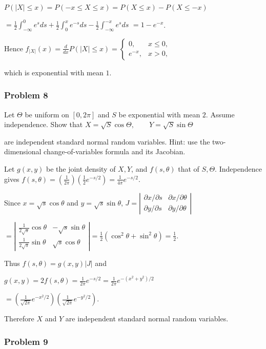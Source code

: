 $P(|X|\leq x)=P(-x\leq X\leq x)=P(X\leq x)-P(X\leq-x)$

$=\frac12\int_{-\infty}^0e^sds+\frac12\int_0^xe^{-s}ds-\frac12\int_{-\infty}^{-x}e^sds$
$=1-e^{-x}$.

Hence
$f_{|X|}(x)=\frac{d}{dx}P(|X|\leq x)=\begin{cases}0,&x\leq0,\\e^{-x},&x>0,\end{cases}$

which is exponential with mean $1$.

\subsubsection*{Problem 8}

 Let $\Theta$ be uniform on $[0,2\pi]$ and $S$ be exponential with mean $2$. Assume independence. Show that
$X=\sqrt S\cos\Theta,\qquad Y=\sqrt S\sin\Theta$

are independent standard normal random variables. Hint: use the two-dimensional change-of-variables formula and its Jacobian.

 Let $g(x,y)$ be the joint density of $X,Y$, and $f(s,\theta)$ that of $S,\Theta$. Independence gives
$f(s,\theta)=\left(\frac1{2\pi}\right)\left(\frac12e^{-s/2}\right)=\frac1{4\pi}e^{-s/2}$.

Since $x=\sqrt s\cos\theta$ and $y=\sqrt s\sin\theta$,
$J=\left|\begin{matrix}\partial x/\partial s&\partial x/\partial\theta\\\partial y/\partial s&\partial y/\partial\theta\end{matrix}\right|$

$=\left|\begin{matrix}\frac1{2\sqrt s}\cos\theta&-\sqrt s\sin\theta\\\frac1{2\sqrt s}\sin\theta&\sqrt s\cos\theta\end{matrix}\right|=\frac12(\cos^2\theta+\sin^2\theta)=\frac12$.

Thus $f(s,\theta)=g(x,y)|J|$ and

$g(x,y)=2f(s,\theta)=\frac1{2\pi}e^{-s/2}=\frac1{2\pi}e^{-(x^2+y^2)/2}$

$=\left(\frac1{\sqrt{2\pi}}e^{-x^2/2}\right)\left(\frac1{\sqrt{2\pi}}e^{-y^2/2}\right)$.

Therefore $X$ and $Y$ are independent standard normal random variables.

\subsubsection*{Problem 9}

